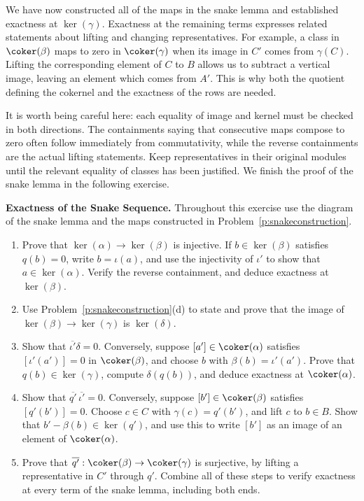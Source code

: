 \documentclass[12pt,reqno]{amsart}
\begin{document}
\hrulefill

We have now constructed all of the maps in the snake lemma and established exactness at $\ker(\gamma)$. Exactness at the remaining terms expresses related statements about lifting and changing representatives. For example, a class in $\coker(\beta)$ maps to zero in $\coker(\gamma)$ when its image in $C'$ comes from $\gamma(C)$. Lifting the corresponding element of $C$ to $B$ allows us to subtract a vertical image, leaving an element which comes from $A'$. This is why both the quotient defining the cokernel and the exactness of the rows are needed.

It is worth being careful here: each equality of image and kernel must be checked in both directions. The containments saying that consecutive maps compose to zero often follow immediately from commutativity, while the reverse containments are the actual lifting statements. Keep representatives in their original modules until the relevant equality of classes has been justified. We finish the proof of the snake lemma in the following exercise.

\hrulefill

\begin{problems}
\item\label{p:snakeexactness} \textbf{Exactness of the Snake Sequence.} Throughout this exercise use the diagram of the snake lemma and the maps constructed in Problem~\ref{p:snakeconstruction}.
\begin{enumerate}
\item Prove that $\ker(\alpha)\to\ker(\beta)$ is injective. If $b\in\ker(\beta)$ satisfies $q(b)=0$, write $b=\iota(a)$, and use the injectivity of $\iota'$ to show that $a\in\ker(\alpha)$. Verify the reverse containment, and deduce exactness at $\ker(\beta)$.
\item Use Problem~\ref{p:snakeconstruction}(d) to state and prove that the image of $\ker(\beta)\to\ker(\gamma)$ is $\ker(\delta)$.
\item Show that $\overline{\iota'}\delta=0$. Conversely, suppose $[a']\in\coker(\alpha)$ satisfies $[\iota'(a')]=0$ in $\coker(\beta)$, and choose $b$ with $\beta(b)=\iota'(a')$. Prove that $q(b)\in\ker(\gamma)$, compute $\delta(q(b))$, and deduce exactness at $\coker(\alpha)$.
\item Show that $\overline{q'}\,\overline{\iota'}=0$. Conversely, suppose $[b']\in\coker(\beta)$ satisfies $[q'(b')]=0$. Choose $c\in C$ with $\gamma(c)=q'(b')$, and lift $c$ to $b\in B$. Show that $b'-\beta(b)\in\ker(q')$, and use this to write $[b']$ as an image of an element of $\coker(\alpha)$.
\item Prove that $\overline{q'}:\coker(\beta)\to\coker(\gamma)$ is surjective, by lifting a representative in $C'$ through $q'$. Combine all of these steps to verify exactness at every term of the snake lemma, including both ends.
\end{enumerate}
\end{problems}
\end{document}
